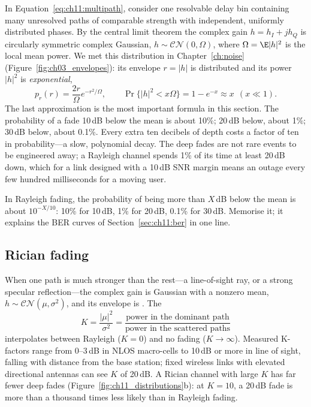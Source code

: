 In Equation~\eqref{eq:ch11:multipath}, consider one resolvable delay bin containing many
unresolved paths of comparable strength with independent, uniformly distributed phases. By the
central limit theorem the complex gain $h=h_I+jh_Q$ is circularly symmetric complex Gaussian,
$h\sim\mathcal{CN}(0,\Omega)$, where $\Omega=\E|h|^2$ is the local mean power. We met this
distribution in Chapter~\ref{ch:noise} (Figure~\ref{fig:ch03_envelopes}): its envelope $r=|h|$ is
 distributed and its power $|h|^2$ is \emph{exponential},
\begin{equation}
p_r(r)=\frac{2r}{\Omega}e^{-r^2/\Omega},\qquad
\Pr\{|h|^2<x\Omega\}=1-e^{-x}\approx x\ \ (x\ll1).
\label{eq:ch11:rayleigh}
\end{equation}
The last approximation is the most important formula in this section. The probability of a fade
10\,dB below the mean is about 10\%; 20\,dB below, about 1\%; 30\,dB below, about 0.1\%. Every
extra ten decibels of depth costs a factor of ten in probability---a slow, polynomial decay. The
deep fades are not rare events to be engineered away; a Rayleigh channel spends 1\% of its time
at least 20\,dB down, which for a link designed with a 10\,dB SNR margin means an outage every few
hundred milliseconds for a moving user.

\begin{keyidea}
In Rayleigh fading, the probability of being more than $X$\,dB below the mean is about
$10^{-X/10}$: 10\% for 10\,dB, 1\% for 20\,dB, 0.1\% for 30\,dB. Memorise it; it explains the BER
curves of Section~\ref{sec:ch11:ber} in one line.
\end{keyidea}

\subsection{Rician fading}

When one path is much stronger than the rest---a line-of-sight ray, or a strong specular
reflection---the complex gain is Gaussian with a nonzero mean, $h\sim\mathcal{CN}(\mu,\sigma^2)$,
and its envelope is . The 
\begin{equation}
K=\frac{|\mu|^2}{\sigma^2}=\frac{\text{power in the dominant path}}{\text{power in the scattered paths}}
\end{equation}
interpolates between Rayleigh ($K=0$) and no fading ($K\to\infty$). Measured K-factors range from
0--3\,dB in NLOS macro-cells to 10\,dB or more in line of sight, falling with distance from the base
station; fixed wireless links with elevated directional antennas can see $K$ of 20\,dB. A Rician
channel with large $K$ has far fewer deep fades (Figure~\ref{fig:ch11_distributions}b): at $K=10$,
a 20\,dB fade is more than a thousand times less likely than in Rayleigh fading.


